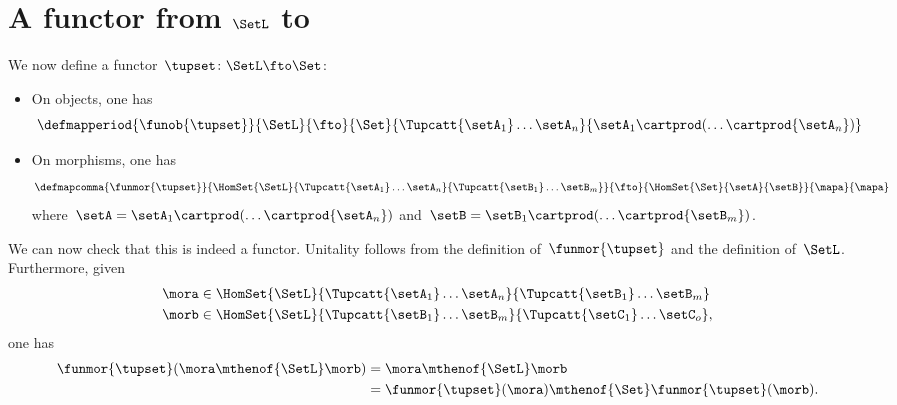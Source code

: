 \section{A functor from $\SetL$ to \Set}
\label{sec:funsetstarset}
We now define a functor~$\tupset\colon \SetL \fto \Set$:
\begin{itemize}
    \item On objects, one has
          \begin{equation*}
              \defmapperiod{\funob{\tupset}}{\SetL}{\fto}{\Set}{\Tupcatt {\setA_1}  \dots {\setA_n}}{{\setA_1}\cartprod (\ldots \cartprod {\setA_n})}
          \end{equation*}
    \item On morphisms, one has
          \begin{equation*}
              \defmapcomma{\funmor{\tupset}}{\HomSet{\SetL}{\Tupcatt{\setA_1}\dots{\setA_n}}{\Tupcatt{\setB_1} \dots {\setB_m}}}
              {\fto}{\HomSet{\Set}{\setA}{\setB}}{\mapa}{\mapa}
          \end{equation*}
          where~$\setA={\setA_1} \cartprod (\ldots \cartprod {\setA_n})$ and~$\setB={\setB_1} \cartprod (\ldots \cartprod {\setB_m})$.
\end{itemize}
We can now check that this is indeed a functor.
Unitality follows from the definition of~$\funmor{\tupset}$ and the definition of~$\SetL$.
Furthermore, given
\begin{equation*}
    \begin{aligned}
         & \mora \in \HomSet{\SetL}{\Tupcatt{\setA_1}\dots{\setA_n}}{\Tupcatt{\setB_1} \dots {\setB_m}} \\
         & \morb \in \HomSet{\SetL}{\Tupcatt{\setB_1}\dots{\setB_m}}{\Tupcatt{\setC_1}\dots {\setC_o}},
    \end{aligned}
\end{equation*}
one has
\begin{equation*}
    \begin{aligned}
        \funmor{\tupset}(\mora \mthenof{\SetL} \morb) & =\mora\mthenof{\SetL} \morb \\
                                                      & =\funmor{\tupset}(\mora)\mthenof{\Set} \funmor{\tupset}(\morb).
    \end{aligned}
\end{equation*}

\showslides{
    \begin{forslides}

        \begin{equation}
            \tupca \ela   = \ela
        \end{equation}
        ~
        \begin{equation}
            \label{eq:sets-monoid-el-cat}
            \tupcat \ela \elb \elconcat \elc = \tupcatt \ela \elb \elc
        \end{equation}
    \end{forslides}
}
